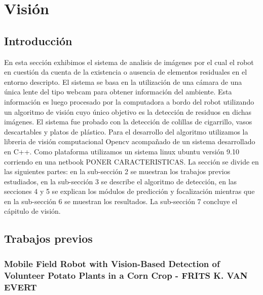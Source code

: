 ﻿\section{Visión}

\subsection{Introducción}
En esta sección exhibimos el sistema de analisis de imágenes por 
el cual el robot en cuestión da cuenta de la existencia o ausencia de 
elementos residuales en el entorno descripto. El sistema se basa en la 
utilización de una cámara de una única lente del tipo webcam para 
obtener información del ambiente. Esta información es luego procesado 
por la computadora a bordo del robot utilizando un algoritmo de visión 
cuyo único objetivo es la detección de residuos 
en dichas imágenes. El sistema fue probado con la detección de 
colillas de cigarrillo, vasos descartables y platos de plástico. Para 
el desarrollo del algoritmo utilizamos la libreria de visión 
computacional Opencv \cite{opencv_library} acompañado de un sistema 
desarrollado en C++. Como plataforma utilizamos un sistema linux 
ubuntu versión 9.10 corriendo en una netbook PONER CARACTERISTICAS.
La sección se divide en las siguientes partes: en la sub-sección 2 se 
muestran los trabajos previos estudiados, en la sub-sección 3 se 
describe el algoritmo de detección, en las secciones 4 y 5 se explican 
los módulos de predicción y focalización mientras que en la 
sub-sección 6 se muestran los resultados. La sub-sección 7 concluye 
el cápitulo de visión.

\subsection{Trabajos previos}
	\subsubsection{Mobile Field Robot with Vision-Based Detection of Volunteer Potato Plants in a Corn Crop - FRITS K. VAN EVERT}
	\cite{potato}
